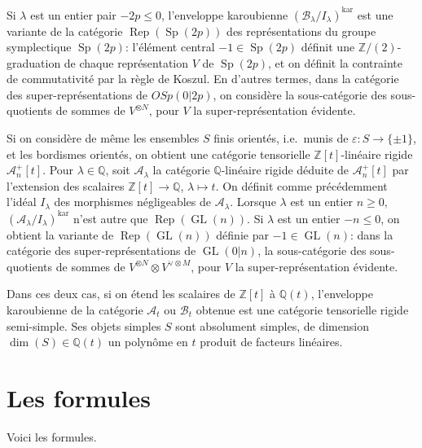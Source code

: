 \documentclass[11pt,a4paper]{article}
\DeclareMathOperator{\Rep}{Rep}
\DeclareMathOperator{\GL}{GL}
\DeclareMathOperator{\Sp}{Sp}
\newcommand{\Q}{\mathbb{Q}}
\newcommand{\Z}{\mathbb{Z}}
\begin{document}
Si $\lambda$ est un entier pair $-2p \leq 0$, l'enveloppe karoubienne $(\mathcal{B}_\lambda/I_\lambda)^{\text{kar}}$ est une variante de la cat\'egorie $\Rep(\Sp(2p))$ des repr\'esentations du groupe symplectique $\Sp(2p)$: l'\'el\'ement central $-1 \in \Sp(2p)$ d\'efinit une $\Z/(2)$-graduation de chaque repr\'esentation $V$ de $\Sp(2p)$, et on d\'efinit la contrainte de commutativit\'e par la r\`egle de Koszul. En d'autres termes, dans la cat\'egorie des super-repr\'esentations de $OSp(0|2p)$, on consid\`ere la sous-cat\'egorie des sous-quotients de sommes de $V^{\otimes N}$, pour $V$ la super-repr\'esentation \'evidente.

Si on consid\`ere de m\^eme les ensembles $S$ finis orient\'es, i.e.~munis de $\varepsilon: S \to \{\pm 1\}$, et les bordismes orient\'es, on obtient une cat\'egorie tensorielle $\Z[t]$-lin\'eaire rigide $\mathcal{A}_n^+[t]$. Pour $\lambda \in \Q$, soit $\mathcal{A}_\lambda$ la cat\'egorie $\Q$-lin\'eaire rigide d\'eduite de $\mathcal{A}_n^+[t]$ par l'extension des scalaires $\Z[t] \to \Q$, $\lambda \mapsto t$. On d\'efinit comme pr\'ec\'edemment l'id\'eal $I_\lambda$ des morphismes n\'egligeables de $\mathcal{A}_\lambda$. Lorsque $\lambda$ est un entier $n \geq 0$, $(\mathcal{A}_\lambda/I_\lambda)^{\text{kar}}$ n'est autre que $\Rep(\GL(n))$. Si $\lambda$ est un entier $-n \leq 0$, on obtient la variante de $\Rep(\GL(n))$ d\'efinie par $-1 \in \GL(n)$: dans la cat\'egorie des super-repr\'esentations de $\GL(0|n)$, la sous-cat\'egorie des sous-quotients de sommes de $V^{\otimes N} \otimes V^{\vee \otimes M}$, pour $V$ la super-repr\'esentation \'evidente.

Dans ces deux cas, si on \'etend les scalaires de $\Z[t]$ \`a $\Q(t)$, l'enveloppe karoubienne de la cat\'egorie $\mathcal{A}_t$ ou $\mathcal{B}_t$ obtenue est une cat\'egorie tensorielle rigide semi-simple. Ses objets simples $S$ sont absolument simples, de dimension $\dim(S) \in \Q(t)$ un polyn\^ome en $t$ produit de facteurs lin\'eaires.

\section*{Les formules}

Voici les formules.
\end{document}
